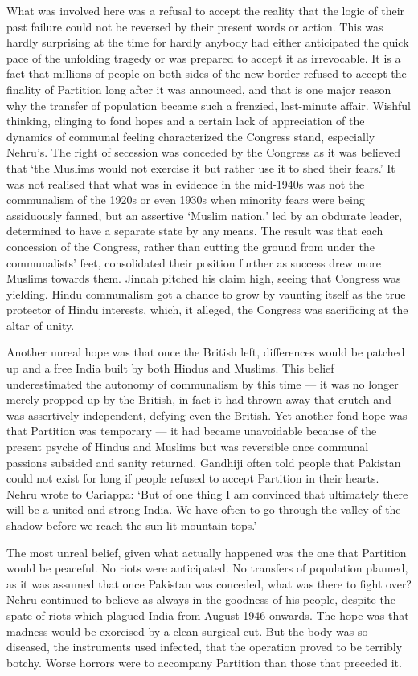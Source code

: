 \begin{multicols}{2}
What was involved here was a refusal to accept the reality that the logic of their past failure could not be reversed by their present words or action. This was hardly surprising at the time for hardly anybody had either anticipated the quick pace of the unfolding tragedy or was prepared to accept it as irrevocable. It is a fact that millions of people on both sides of the new border refused to accept the finality of Partition long after it was announced, and that is one major reason why the transfer of population became such a frenzied, last-minute affair. Wishful thinking, clinging to fond hopes and a certain lack of appreciation of the dynamics of communal feeling characterized the Congress stand, especially Nehru's. The right of secession was conceded by the Congress as it was believed that `the Muslims would not exercise it but rather use it to shed their fears.' It was not realised that what was in evidence in the mid-1940s was not the communalism of the 1920s or even 1930s when minority fears were being assiduously fanned, but an assertive `Muslim nation,' led by an obdurate leader, determined to have a separate state by any means. The result was that each concession of the Congress, rather than cutting the ground from under the communalists' feet, consolidated their position further as success drew more Muslims towards them. Jinnah pitched his claim high, seeing that Congress was yielding. Hindu communalism got a chance to grow by vaunting itself as the true protector of Hindu interests, which, it alleged, the Congress was sacrificing at the altar of unity. 

Another unreal hope was that once the British left, differences would be patched up and a free India built by both Hindus and Muslims. This belief underestimated the autonomy of communalism by this time --- it was no longer merely propped up by the British, in fact it had thrown away that crutch and was assertively independent, defying even the British. Yet another fond hope was that Partition was temporary --- it had became unavoidable because of the present psyche of Hindus and Muslims but was reversible once communal passions subsided and sanity returned. Gandhiji often told people that Pakistan could not exist for long if people refused to accept Partition in their hearts. Nehru wrote to Cariappa: `But of one thing I am convinced that ultimately there will be a united and strong India. We have often to go through the valley of the shadow before we reach the sun-lit mountain tops.' 

The most unreal belief, given what actually happened was the one that Partition would be peaceful. No riots were anticipated. No transfers of population planned, as it was assumed that once Pakistan was conceded, what was there to fight over? Nehru continued to believe as always in the goodness of his people, despite the spate of riots which plagued India from August 1946 onwards. The hope was that madness would be exorcised by a clean surgical cut. But the body was so diseased, the instruments used infected, that the operation proved to be terribly botchy. Worse horrors were to accompany Partition than those that preceded it. 


\end{multicols}
